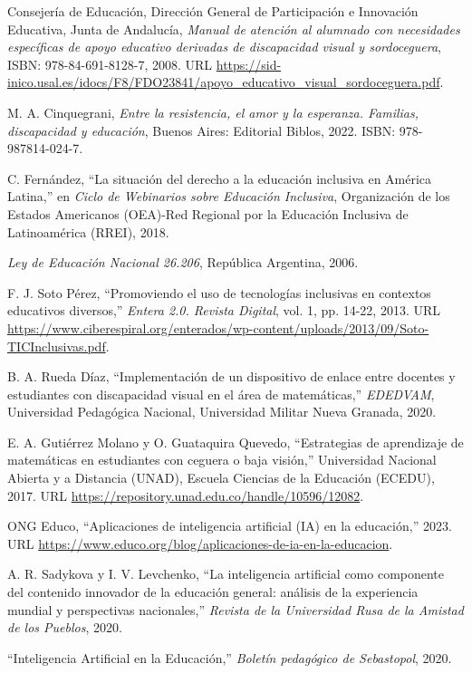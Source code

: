 \documentclass{article}
\begin{document}
\begin{enumerate}[noitemsep, topsep=0pt, parsep=0pt, partopsep=0pt]
{		\item Consejería de Educación, Dirección General de Participación e Innovación Educativa, Junta de Andalucía, \emph{Manual de atención al alumnado con necesidades específicas de apoyo educativo derivadas de discapacidad visual y sordoceguera}, ISBN: 978-84-691-8128-7, 2008. URL  \url{https://sid-inico.usal.es/idocs/F8/FDO23841/apoyo_educativo_visual_sordoceguera.pdf}.
		\item M. A. Cinquegrani, \emph{Entre la resistencia, el amor y la esperanza. Familias, discapacidad y educación}, Buenos Aires: Editorial Biblos, 2022. ISBN: 978-987814-024-7.
		\item C. Fernández, ``La situación del derecho a la educación inclusiva en América Latina,'' en \emph{Ciclo de Webinarios sobre Educación Inclusiva}, Organización de los Estados Americanos (OEA)-Red Regional por la Educación Inclusiva de Latinoamérica (RREI), 2018.
		\item \emph{Ley de Educación Nacional 26.206}, República Argentina, 2006.
		\item F. J. Soto Pérez, ``Promoviendo el uso de tecnologías inclusivas en contextos educativos diversos,'' \emph{Entera 2.0. Revista Digital}, vol. 1, pp. 14-22, 2013. URL  \url{https://www.ciberespiral.org/enterados/wp-content/uploads/2013/09/Soto-TICInclusivas.pdf}.
		\item B. A. Rueda Díaz, ``Implementación de un dispositivo de enlace entre docentes y estudiantes con discapacidad visual en el área de matemáticas,'' \emph{EDEDVAM}, Universidad Pedagógica Nacional, Universidad Militar Nueva Granada, 2020.
		\item E. A. Gutiérrez Molano y O. Guataquira Quevedo, ``Estrategias de aprendizaje de matemáticas en estudiantes con ceguera o baja visión,'' Universidad Nacional Abierta y a Distancia (UNAD), Escuela Ciencias de la Educación (ECEDU), 2017. URL  \url{https://repository.unad.edu.co/handle/10596/12082}.
		\item ONG Educo, ``Aplicaciones de inteligencia artificial (IA) en la educación,'' 2023. URL  \url{https://www.educo.org/blog/aplicaciones-de-ia-en-la-educacion}.
		\item A. R. Sadykova y I. V. Levchenko, ``La inteligencia artificial como componente del contenido innovador de la educación general: análisis de la experiencia mundial y perspectivas nacionales,'' \emph{Revista de la Universidad Rusa de la Amistad de los Pueblos}, 2020.
		\item ``Inteligencia Artificial en la Educación,'' \emph{Boletín pedagógico de Sebastopol}, 2020.
}
\end{enumerate}
\end{document}
